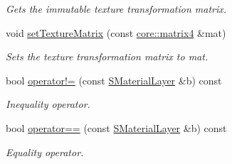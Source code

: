 \begin{DoxyCompactItemize}
\begin{DoxyCompactList}\small\item\em Gets the immutable texture transformation matrix. \end{DoxyCompactList}\item 
void \hyperlink{classirr_1_1video_1_1SMaterialLayer_a0f84f47351a17b2a6041688a425fda1a}{set\+Texture\+Matrix} (const \hyperlink{namespaceirr_1_1core_a73fa92e638c5ca97efd72da307cc9b65}{core\+::matrix4} \&mat)
\begin{DoxyCompactList}\small\item\em Sets the texture transformation matrix to mat. \end{DoxyCompactList}\item 
bool \hyperlink{classirr_1_1video_1_1SMaterialLayer_a2d379f02b6a06600df2b0eaf252c8f71}{operator!=} (const \hyperlink{classirr_1_1video_1_1SMaterialLayer}{S\+Material\+Layer} \&b) const
\begin{DoxyCompactList}\small\item\em Inequality operator. \end{DoxyCompactList}\item 
bool \hyperlink{classirr_1_1video_1_1SMaterialLayer_a0c342c76ebd572bba7ae0922a22dadb7}{operator==} (const \hyperlink{classirr_1_1video_1_1SMaterialLayer}{S\+Material\+Layer} \&b) const
\begin{DoxyCompactList}\small\item\em Equality operator. \end{DoxyCompactList}\end{DoxyCompactItemize}
